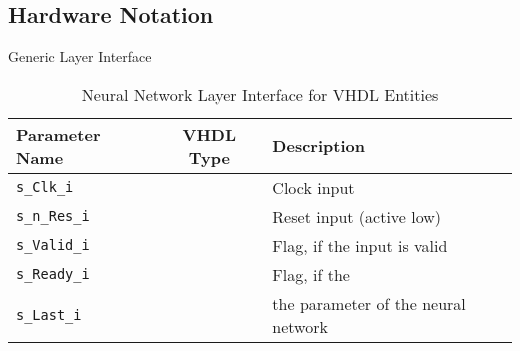 \subsection{Hardware Notation}


Generic Layer Interface

\begin{table}[h!]
\centering	
\begin{tabular}{l|cl}
	\toprule
	Parameter Name 		   	   & VHDL Type  & Description 								\\
	\midrule
	\texttt{s\_Clk\_i} 	       & \stdlogic  & Clock input								\\
	\texttt{s\_n\_Res\_i} 	   & \stdlogic  & Reset input (active low)					\\
	\texttt{s\_Valid\_i} 	   & \stdlogic  & Flag, if the input is valid				\\
	\texttt{s\_Ready\_i} 	   & \stdlogic  & Flag, if the 								\\
	\texttt{s\_Last\_i} 	   & \stdlogic  & the parameter of the neural network		\\
	\bottomrule
\end{tabular}
\caption{Neural Network Layer Interface for VHDL Entities}
\label{tab:hw-layer-interface}
\end{table}

